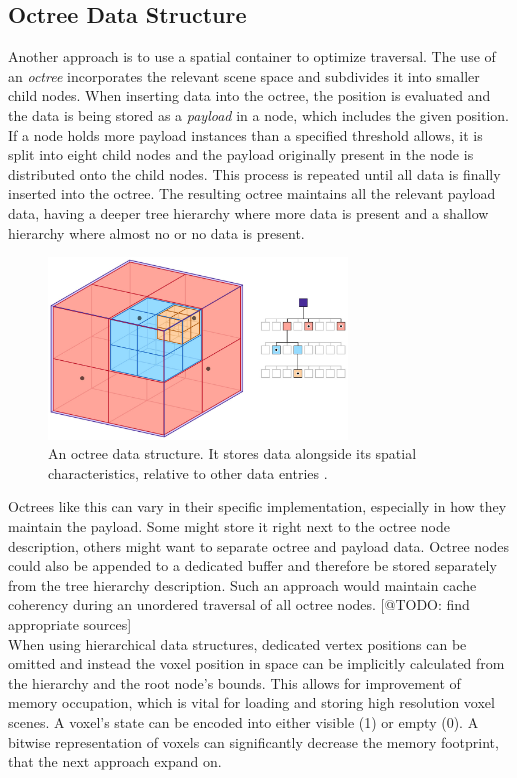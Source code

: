 \subsection*{Octree Data Structure} \label{subsec-octree-data-structure}

Another approach is to use a spatial container to optimize traversal. The use of an \emph{octree} 
incorporates the relevant scene space and subdivides it into smaller child nodes. When inserting data 
into the octree, the position is evaluated and the data is being stored as a \emph{payload} in 
a node, which includes the given position. If a node holds more payload instances than a specified threshold 
allows, it is split into eight child nodes and the payload originally present in the node is 
distributed onto the child nodes. This process is repeated until all data is finally inserted 
into the octree. The resulting octree maintains all the relevant payload data, having a deeper tree 
hierarchy where more data is present and a shallow hierarchy where almost no or no data is present.

\begin{figure}[h]
    \centering
    \includegraphics[width=300px]{images/graphics/octree.jpg}
    \caption{An octree data structure. It stores data alongside its spatial characteristics, relative to 
    other data entries \cite{Six2021}.}
    \label{fig:octree}
\end{figure}

\noindent
Octrees like this can vary in their specific implementation, especially in how they maintain the 
payload. Some might store it right next to the octree node description, others might want to separate 
octree and payload data. Octree nodes could also be appended to a dedicated buffer and therefore be stored 
separately from the tree hierarchy description. Such an approach would maintain cache coherency during an 
unordered traversal of all octree nodes. [@TODO: find appropriate sources]\\

\noindent
When using hierarchical data structures, dedicated vertex positions can be omitted and instead 
the voxel position in space can be implicitly calculated from the hierarchy and the root node's bounds. 
This allows for improvement of memory occupation, which is vital for loading and storing high 
resolution voxel scenes. A voxel's state can be encoded into either visible (1) or empty (0).
A bitwise representation of voxels can significantly decrease the memory footprint, that the next 
approach expand on.


